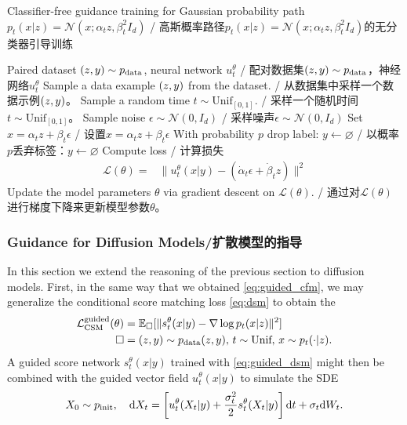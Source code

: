 \begin{algorithm}[h]
\caption{Classifier-free guidance training for Gaussian probability path $p_t(x|z)=\mathcal{N}(x;\alpha_tz,\beta_t^2I_d)$ / 高斯概率路径$p_t(x|z)=\mathcal{N}(x;\alpha_tz,\beta_t^2I_d)$的无分类器引导训练}
\label{alg:training_fm_score_matching_gaussian_paths}
\begin{algorithmic}[1]
\REQUIRE Paired dataset $(z,y)\sim p_{\rm{data}}$, neural network $u_t^\theta$ / 配对数据集$(z,y)\sim p_{\rm{data}}$，神经网络$u_t^\theta$
    \STATE Sample a data example $(z,y)$ from the dataset. / 从数据集中采样一个数据示例$(z,y)$。
    \STATE Sample a random time $t \sim \text{Unif}_{[0,1]}$. / 采样一个随机时间$t \sim \text{Unif}_{[0,1]}$。
    \STATE Sample noise $\epsilon\sim\mathcal{N}(0,I_d)$ / 采样噪声$\epsilon\sim\mathcal{N}(0,I_d)$
    \STATE Set $x=\alpha_t z + \beta_t \epsilon$ / 设置$x=\alpha_t z + \beta_t \epsilon$
    \STATE With probability $p$ drop label: $y\leftarrow \varnothing$ / 以概率$p$丢弃标签：$y\leftarrow \varnothing$
    \STATE Compute loss / 计算损失
    \begin{align*}
        \mathcal{L}(\theta) =& \|u_t^\theta(x|y)-(\dot{\alpha}_t\epsilon+\dot{\beta}_tz)\|^2 
    \end{align*}
    \STATE Update the model parameters $\theta$ via gradient descent on $\mathcal{L}(\theta)$. / 通过对$\mathcal{L}(\theta)$进行梯度下降来更新模型参数$\theta$。
\ENDFOR
\end{algorithmic}
\end{algorithm}

\subsubsection{Guidance for Diffusion Models/扩散模型的指导}
In this section we extend the reasoning of the previous section to diffusion models. First, in the same way that we obtained \cref{eq:guided_cfm}, we may generalize the conditional score matching loss \cref{eq:dsm} to obtain the 
\begin{align}
    \label{eq:guided_dsm}
    \mathcal{L}_{\text{CSM}}^{\text{guided}}(\theta) &= \mathbb{E}_{\square}[\|s_t^\theta(x|y) - \nabla\log p_t(x|z)\|^2]\\
    \square &= (z,y)\sim p_{\rm{data}}(z,y), \,t\sim \text{Unif},\,x\sim p_t(\cdot|z).
\end{align}
A guided score network $s_t^\theta(x|y)$ trained with \cref{eq:guided_dsm} might then be combined with the guided vector field $u_t^\theta(x|y)$ to simulate the SDE
\begin{equation*}
    X_0 \sim p_{\rm{init}},\quad \mathrm{d} X_t = \left[u_t^\theta(X_t|y)+\frac{\sigma_t^2}{2}s_t^\theta(X_t|y)\right]\mathrm{d} t + \sigma_t\mathrm{d} W_t.
\end{equation*}

